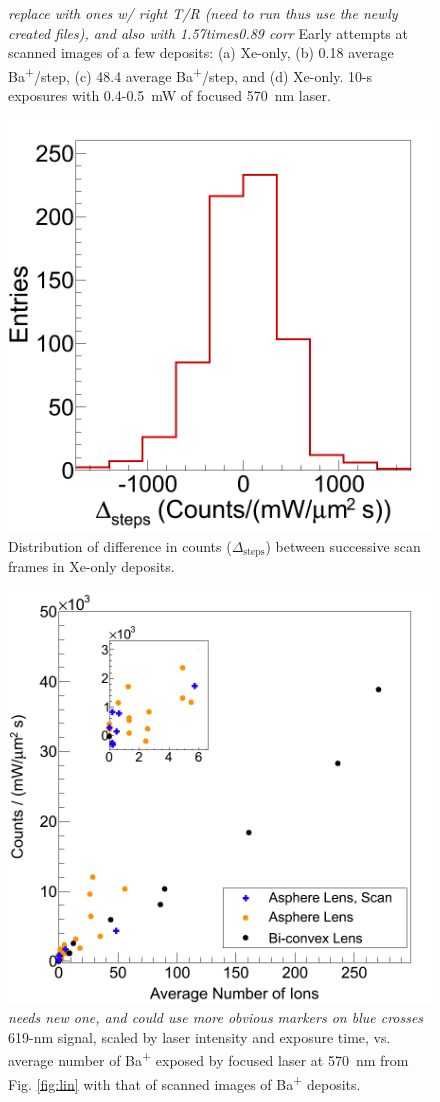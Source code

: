 \begin{figure}
                \caption{\emph{\color{gray}replace with ones w/ right T/R (need to run thus use the newly created files), and also with 1.57times0.89 corr} Early attempts at scanned images of a few deposits: (a) Xe-only, (b) 0.18 average Ba\textsuperscript{+}/step, (c) 48.4 average Ba\textsuperscript{+}/step, and (d) Xe-only.  10-s exposures with 0.4-0.5~mW of focused 570~nm laser.}
\label{fig:scans}
\end{figure}

\begin{figure} %
        \centering
                \includegraphics[width=.35\textwidth]{figures/scans_dframeXe.png}
                \caption{Distribution of difference in counts ($\Delta_{\text{steps}}$) between successive scan frames in Xe-only deposits.}
\label{fig:scanVarXe}
\end{figure}

\begin{figure} %
        \centering
                \includegraphics[width=.45\textwidth]{figures/lin_withScan_lin.png}
                \caption{\emph{\color{gray}needs new one, and could use more obvious markers on blue crosses} 619-nm signal, scaled by laser intensity and exposure time, vs. average number of Ba\textsuperscript{+} exposed by focused laser at 570~nm from Fig. \ref{fig:lin} with that of scanned images of Ba\textsuperscript{+} deposits.}
\label{fig:linScan}
\end{figure}

